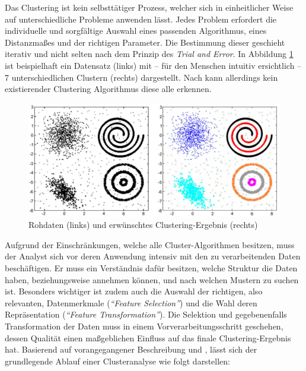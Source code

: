 Das Clustering ist kein selbsttätiger Prozess, welcher sich in
einheitlicher Weise auf unterschiedliche Probleme anwenden lässt. Jedes Problem erfordert die individuelle und sorgfältige
Auswahl eines passenden Algorithmus, eines Distanzmaßes und der richtigen Parameter. Die Bestimmung dieser geschieht
iterativ und nicht selten nach dem Prinzip des \textit{Trial and Error}. In Abbildung \ref{fig:grund_clustering_example}
ist beispielhaft ein Datensatz (links) mit -- für den Menschen intuitiv ersichtlich -- 7 unterschiedlichen Clustern (rechts)
dargestellt. Nach \cite[]{Jain2010} kann allerdings kein existierender Clustering Algorithmus diese alle erkennen.
\cite[]{Jain1999, tan2007introduction}

\begin{figure}[H]
    \centering
    \includegraphics[width=0.8\linewidth]{resources/img/grundlagen/clustering_example}
    \caption[Rohdaten (links) und erwünschtes Clustering-Ergebnis (rechts)]{Rohdaten (links) und erwünschtes Clustering-Ergebnis (rechts) \cite[]{Jain2010}}
    \label{fig:grund_clustering_example}
\end{figure}

Aufgrund der Einschränkungen, welche alle Cluster-Algorithmen besitzen, muss der Analyst sich vor deren Anwendung intensiv
mit den zu verarbeitenden Daten beschäftigen. Er muss ein Verständnis dafür besitzen, welche Struktur die Daten
haben, beziehungsweise annehmen können, und nach welchen Mustern zu suchen ist.
Besonders wichtiger ist zudem auch die Auswahl der richtigen, also relevanten, Datenmerkmale (\textit{``Feature Selection''})
und die Wahl deren Repräsentation (\textit{``Feature Transformation''}).
Die Selektion und gegebenenfalls Transformation der Daten muss in einem
Vorverarbeitungsschritt geschehen, dessen Qualität einen maßgeblichen Einfluss auf das finale Clustering-Ergebnis hat.
Basierend auf vorangegangener Beschreibung und \cite[]{Jain1999}, lässt sich der grundlegende Ablauf einer Clusteranalyse wie folgt darstellen: \\

